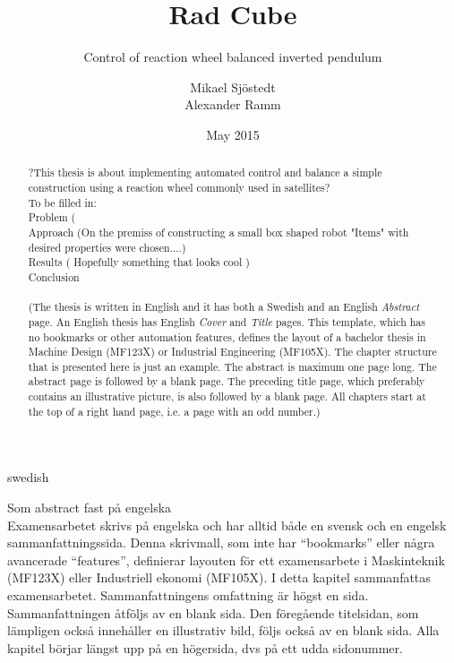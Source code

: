 \documentclass[a4paper,11pt]{kth-mag}
\title{Rad Cube}
\subtitle{Control of reaction wheel balanced inverted pendulum}
\author{Mikael Sjöstedt \\ Alexander Ramm}
\date{May 2015}
\begin{document}
%
\clearpage

\frontmatter
\pagestyle{plain}
{}
\maketitle
{}
\begin{abstract}
?This thesis is about implementing automated control and balance a simple construction using a reaction wheel commonly used in satellites? 
\\ To be filled in:
\\Problem ( 
\\Approach (On the premiss of constructing a small box shaped robot "Items" with desired properties were chosen....)
\\Results ( Hopefully something that looks cool ) 
\\ Conclusion
\\ \\
(The thesis is written in English and it has both a Swedish and an English \textit{Abstract} page. An English thesis has English \textit{Cover} and \textit{Title} pages. This template, which has no bookmarks or other automation features, defines the layout of a bachelor thesis in Machine Design (MF123X) or Industrial Engineering (MF105X).  The chapter structure that is presented here is just an example.
The abstract is maximum one page long. The abstract page is followed by a blank page. The preceding title page, which preferably contains an illustrative picture, is also followed by a blank page. All chapters start at the top of a right hand page, i.e. a page with an odd number.)
\end{abstract}
\cleardoublepage
\begin{foreignabstract}{swedish}
Som abstract fast på engelska
\\
Examensarbetet skrivs på engelska och har alltid både en svensk och en engelsk sammanfattningssida. Denna skrivmall, som inte har ``bookmarks'' eller några avancerade ``features'', definierar layouten för ett examensarbete i Maskinteknik (MF123X) eller Industriell ekonomi (MF105X).
I detta kapitel sammanfattas examensarbetet. Sammanfattningens omfattning är högst en sida. Sammanfattningen åtföljs av en blank sida. Den föregående titelsidan, som lämpligen också innehåller en illustrativ bild, följs också av en blank sida. Alla kapitel börjar längst upp på en högersida, dvs på ett udda sidonummer.
\end{foreignabstract}
\clearpage
\end{document}
